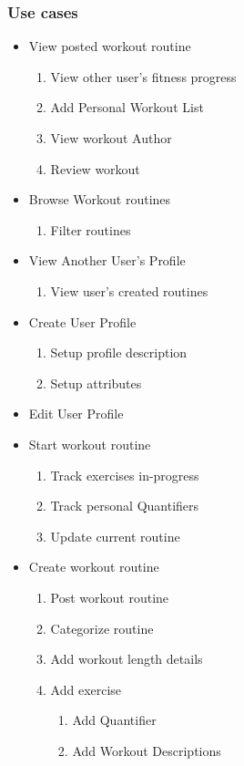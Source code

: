 \documentclass[12pt]{article}
\begin{document}
	\subsubsection{Use cases}
	
	\begin{itemize}
		\item View posted workout routine 
		\begin{enumerate}
			\item View other user's fitness progress
			\item Add Personal Workout List
			\item View workout Author
			\item Review workout
		\end{enumerate}
		
		\item Browse Workout routines
		\begin{enumerate}
			\item Filter routines
		\end{enumerate}
		
		\item View Another User's Profile
		\begin{enumerate}
			\item View user's created routines
		\end{enumerate}
		
		\item Create User Profile
		\begin{enumerate}
			\item Setup profile description
			\item Setup attributes
		\end{enumerate}
		
		\item Edit User Profile
		
		\item Start workout routine
		\begin{enumerate}
			\item Track exercises in-progress
			\item Track personal Quantifiers
			\item Update current routine
		\end{enumerate}
		
		
		\item Create workout routine
		\begin{enumerate}
			\item Post workout routine
			\item Categorize routine
			\item Add workout length details
			\item Add exercise 
			\begin{enumerate}
				\item Add Quantifier
				\item Add Workout Descriptions
			\end{enumerate}
		\end{enumerate}
		

\end{itemize}
\end{document}
